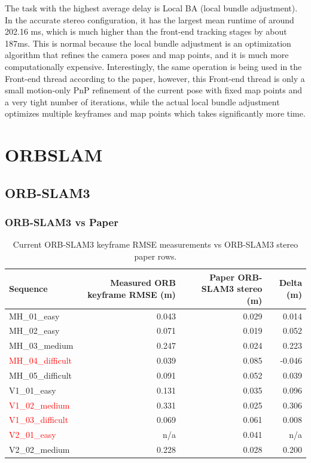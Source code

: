 \documentclass[11pt]{article}
\begin{document}
\endgroup
The task with the highest average delay is Local BA (local bundle adjustment). In the accurate stereo configuration, it has the largest mean runtime of around 202.16 ms, which is much higher than the front-end tracking stages by about 187ms. This is normal because the local bundle adjustment is an optimization algorithm that refines the camera poses and map points, and it is much more computationally expensive. Interestingly, the same operation is being used in the Front-end thread according to the paper, however, this Front-end thread is only a small motion-only PnP refinement of the current pose with fixed map points and a very tight number of iterations, while the actual local bundle adjustment optimizes multiple keyframes and map points which takes significantly more time.
\clearpage

\section{ORBSLAM}

\subsection{ORB-SLAM3}

\subsubsection{ORB-SLAM3 vs Paper}

\begin{table}[H]
\centering
\small
\caption{Current ORB-SLAM3 keyframe RMSE measurements vs ORB-SLAM3 stereo paper rows.}
\label{tab:orb_vs_paper_accuracy}
\begin{tabular}{lrrr}
\toprule
Sequence & Measured ORB keyframe RMSE (m) & Paper ORB-SLAM3 stereo (m) & Delta (m) \\
\midrule
MH\_01\_easy & 0.043 & 0.029 & 0.014 \\
MH\_02\_easy & 0.071 & 0.019 & 0.052 \\
MH\_03\_medium & 0.247 & 0.024 & 0.223 \\
\textcolor{red}{MH\_04\_difficult} & 0.039 & 0.085 & -0.046 \\
MH\_05\_difficult & 0.091 & 0.052 & 0.039 \\
V1\_01\_easy & 0.131 & 0.035 & 0.096 \\
\textcolor{red}{V1\_02\_medium} & 0.331 & 0.025 & 0.306 \\
\textcolor{red}{V1\_03\_difficult} & 0.069 & 0.061 & 0.008 \\
\textcolor{red}{V2\_01\_easy} & n/a & 0.041 & n/a \\
V2\_02\_medium & 0.228 & 0.028 & 0.200 \\
\bottomrule
\end{tabular}
\end{table}
\end{document}
